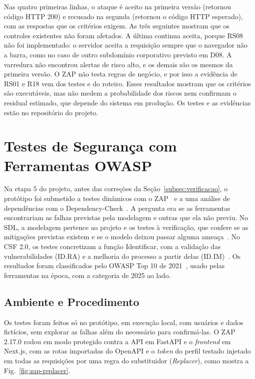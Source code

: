 \documentclass[conference]{IEEEtran}
\begin{document}
Nas quatro primeiras linhas, o ataque é aceito na primeira versão (retornou código HTTP 200) e recusado na segunda (retornou o código HTTP esperado), com as respostas que os critérios exigem. As três seguintes mostram que os controles existentes não foram afetados. A última continua aceita, porque RS08 não foi implementado: o servidor aceita a requisição sempre que o navegador não a barra, como no caso de outro subdomínio corporativo previsto em D08. A varredura não encontrou alertas de risco alto, e os demais são os mesmos da primeira versão. O ZAP não testa regras de negócio, e por isso a evidência de RS01 e R18 vem dos testes e do roteiro. Esses resultados mostram que os critérios são executáveis, mas não medem a probabilidade dos riscos nem confirmam o residual estimado, que depende do sistema em produção. Os testes e as evidências estão no repositório do projeto.

\section{Testes de Segurança com Ferramentas OWASP}
\label{sec:testes-owasp}

Na etapa 5 do projeto, antes das correções da Seção~\ref{subsec:verificacao}, o protótipo foi submetido a testes dinâmicos com o ZAP~\cite{zaproxy} e a uma análise de dependências com o Dependency-Check~\cite{owaspdepcheck}. A pergunta era se as ferramentas encontrariam as falhas previstas pela modelagem e outras que ela não previu. No SDL, a modelagem pertence ao projeto e os testes à verificação, que confere se as mitigações previstas existem e se o modelo deixou passar alguma ameaça~\cite{howard2006,shostack2009}. No CSF 2.0, os testes concretizam a função Identificar, com a validação das vulnerabilidades (ID.RA) e a melhoria do processo a partir delas (ID.IM)~\cite{nist2024csf}. Os resultados foram classificados pelo OWASP Top 10 de 2021~\cite{owasp2021top10}, usado pelas ferramentas na época, com a categoria de 2025 ao lado.

\subsection{Ambiente e Procedimento}
\label{subsec:owasp-ambiente}

Os testes foram feitos só no protótipo, em execução local, com usuários e dados fictícios, sem explorar as falhas além do necessário para confirmá-las. O ZAP 2.17.0 rodou em modo protegido contra a API em FastAPI e o \textit{frontend} em Next.js, com as rotas importadas do OpenAPI e o \textit{token} do perfil testado injetado em todas as requisições por uma regra do substituidor (\textit{Replacer}), como mostra a Fig.~\ref{fig:zap-replacer}. 
\end{document}
